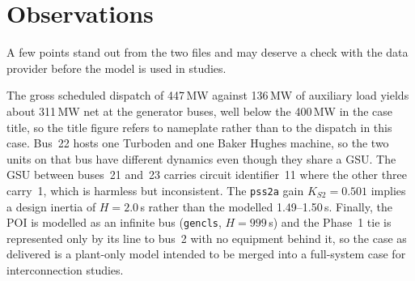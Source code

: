 \section{Observations}
\label{sec:obs}

A few points stand out from the two files and may deserve a check with the data
provider before the model is used in studies.

The gross scheduled dispatch of 447\,MW against 136\,MW of auxiliary load yields
about 311\,MW net at the generator buses, well below the 400\,MW in the case title,
so the title figure refers to nameplate rather than to the dispatch in this case.
Bus~22 hosts one Turboden and one Baker Hughes machine, so the two units on that bus
have different dynamics even though they share a GSU. The GSU between buses~21
and~23 carries circuit identifier~11 where the other three carry~1, which is
harmless but inconsistent. The \texttt{pss2a} gain $K_{S2} = 0.501$ implies a design
inertia of $H = 2.0$\,s rather than the modelled 1.49--1.50\,s. Finally, the POI is
modelled as an infinite bus (\texttt{gencls}, $H = 999$\,s) and the Phase~1 tie is
represented only by its line to bus~2 with no equipment behind it, so the case as
delivered is a plant-only model intended to be merged into a full-system case for
interconnection studies.

